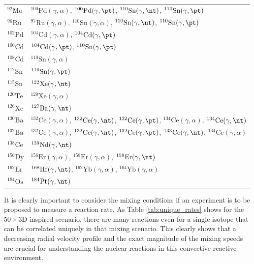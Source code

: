 \begin{table}[!htb]
\begin{tabular}{ll}
$^{92}\mathrm{Mo}$ & $^{100}\mathrm{Pd}(\gamma,\alpha)$, $^{100}\mathrm{Pd}(\gamma,\pt)$, $^{110}\mathrm{Sn}(\gamma,\nt)$, $^{110}\mathrm{Sn}(\gamma,\pt)$ \\
$^{96}\mathrm{Ru}$ & $^{97}\mathrm{Ru}(\gamma,\alpha)$, $^{110}\mathrm{Sn}(\gamma,\alpha)$, $^{110}\mathrm{Sn}(\gamma,\nt)$, $^{110}\mathrm{Sn}(\gamma,\pt)$ \\
$^{102}\mathrm{Pd}$ & $^{104}\mathrm{Cd}(\gamma,\alpha)$, $^{104}\mathrm{Cd}(\gamma,\pt)$ \\
$^{106}\mathrm{Cd}$ & $^{104}\mathrm{Cd}(\gamma,\pt)$, $^{110}\mathrm{Sn}(\gamma,\pt)$ \\
$^{108}\mathrm{Cd}$ & $^{110}\mathrm{Sn}(\gamma,\alpha)$ \\
$^{112}\mathrm{Sn}$ & $^{110}\mathrm{Sn}(\gamma,\pt)$ \\
$^{115}\mathrm{Sn}$ & $^{122}\mathrm{Xe}(\gamma,\nt)$ \\
$^{120}\mathrm{Te}$ & $^{120}\mathrm{Xe}(\gamma,\alpha)$ \\
$^{126}\mathrm{Xe}$ & $^{127}\mathrm{Ba}(\gamma,\nt)$ \\
$^{130}\mathrm{Ba}$ & $^{132}\mathrm{Ce}(\gamma,\alpha)$, $^{132}\mathrm{Ce}(\gamma,\nt)$, $^{132}\mathrm{Ce}(\gamma,\pt)$, $^{134}\mathrm{Ce}(\gamma,\alpha)$, $^{134}\mathrm{Ce}(\gamma,\nt)$ \\
$^{132}\mathrm{Ba}$ & $^{132}\mathrm{Ce}(\gamma,\alpha)$, $^{132}\mathrm{Ce}(\gamma,\nt)$, $^{132}\mathrm{Ce}(\gamma,\pt)$, $^{133}\mathrm{Ce}(\gamma,\nt)$, $^{134}\mathrm{Ce}(\gamma,\alpha)$ \\
$^{138}\mathrm{Ce}$ & $^{139}\mathrm{Nd}(\gamma,\nt)$ \\
$^{156}\mathrm{Dy}$ & $^{156}\mathrm{Er}(\gamma,\alpha)$, $^{158}\mathrm{Er}(\gamma,\alpha)$, $^{158}\mathrm{Er}(\gamma,\nt)$ \\
$^{162}\mathrm{Er}$ & $^{168}\mathrm{Hf}(\gamma,\nt)$, $^{162}\mathrm{Yb}(\gamma,\alpha)$, $^{164}\mathrm{Yb}(\gamma,\alpha)$ \\
$^{184}\mathrm{Os}$ & $^{184}\mathrm{Pt}(\gamma,\nt)$ \\
\hline
\end{tabular}
\end{table}

It is clearly important to consider the mixing conditions if an experiment is to be proposed to measure a reaction rate.
As Table \ref{tab:unique_rates} shows for the $50\times$3D-inspired scenario, there are many reactions even for a single isotope that can be correlated uniquely in that mixing scenario.
This clearly shows that a decreasing radial velocity profile and the exact magnitude of the mixing speeds are crucial for understanding the nuclear reactions in this convective-reactive environment.

